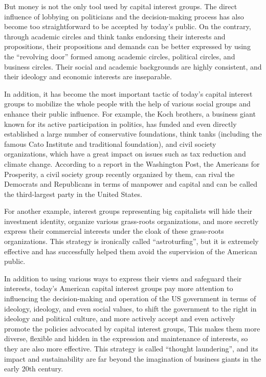 \documentclass[11pt]{article}
\begin{document}
But money is not the only tool used by capital interest groups. The direct influence of lobbying on politicians and the decision-making process has also become too straightforward to be accepted by today's public. On the contrary, through academic circles and think tanks endorsing their interests and propositions, their propositions and demands can be better expressed by using the “revolving door” formed among academic circles, political circles, and business circles. Their social and academic backgrounds are highly consistent, and their ideology and economic interests are inseparable.

In addition, it has become the most important tactic of today's capital interest groups to mobilize the whole people with the help of various social groups and enhance their public influence. For example, the Koch brothers, a business giant known for its active participation in politics, has funded and even directly established a large number of conservative foundations, think tanks (including the famous Cato Institute and traditional foundation), and civil society organizations, which have a great impact on issues such as tax reduction and climate change. According to a report in the Washington Post, the Americans for Prosperity, a civil society group recently organized by them, can rival the Democrats and Republicans in terms of manpower and capital and can be called the third-largest party in the United States.

For another example, interest groups representing big capitalists will hide their investment identity, organize various grass-roots organizations, and more secretly express their commercial interests under the cloak of these grass-roots organizations. This strategy is ironically called “astroturfing”, but it is extremely effective and has successfully helped them avoid the supervision of the American public.

In addition to using various ways to express their views and safeguard their interests, today's American capital interest groups pay more attention to influencing the decision-making and operation of the US government in terms of ideology, ideology, and even social values, to shift the government to the right in ideology and political culture, and more actively accept and even actively promote the policies advocated by capital interest groups, This makes them more diverse, flexible and hidden in the expression and maintenance of interests, so they are also more effective. This strategy is called “thought laundering”, and its impact and sustainability are far beyond the imagination of business giants in the early 20th century.
\end{document}
